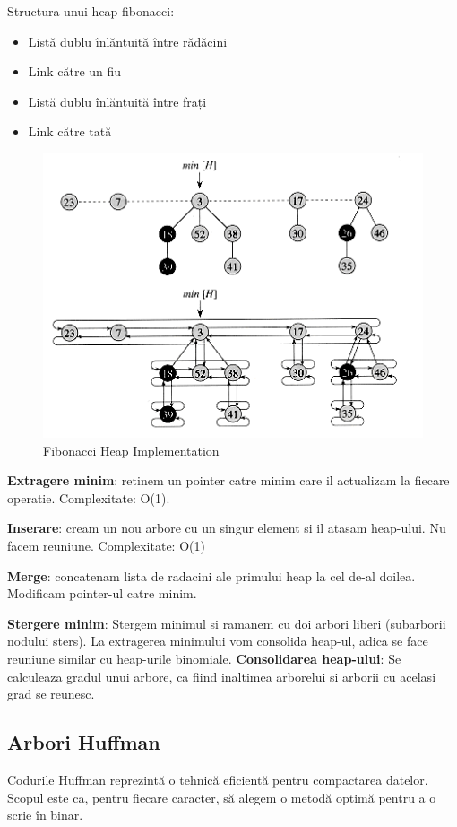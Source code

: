 \documentclass[11pt,a4paper]{article}
\theoremstyle{definition}
\theoremstyle{plain}
\theoremstyle{remark}
\begin{document}
Structura unui heap fibonacci:
\begin{itemize}
    \item Listă dublu înlănțuită între rădăcini
    \item Link către un fiu
    \item Listă dublu înlănțuită între frați
    \item Link către tată
\end{itemize}

\begin{figure}[H]
    \centering
    \includegraphics[width=0.75\linewidth]{fibonacci-heap2.png}
    \caption{Fibonacci Heap Implementation}
    \label{fig:enter-label}
\end{figure}

\textbf{Extragere minim}: retinem un pointer catre minim care il actualizam la fiecare operatie. Complexitate: O(1).

\textbf{Inserare}: cream un nou arbore cu un singur element si il atasam heap-ului. Nu facem reuniune. Complexitate: O(1)

\textbf{Merge}: concatenam lista de radacini ale primului heap la cel de-al doilea. Modificam pointer-ul catre minim.

\textbf{Stergere minim}: Stergem minimul si ramanem cu doi arbori liberi (subarborii nodului sters). La extragerea minimului vom consolida heap-ul, adica se face reuniune similar cu heap-urile binomiale. \textbf{Consolidarea heap-ului}: Se calculeaza gradul unui arbore, ca fiind inaltimea arborelui si arborii cu acelasi grad se reunesc. 

\subsection{Arbori Huffman}
Codurile Huffman reprezintă o tehnică eficientă pentru compactarea datelor. Scopul este ca, pentru fiecare caracter, să alegem o metodă optimă pentru a o scrie în binar.
\end{document}
